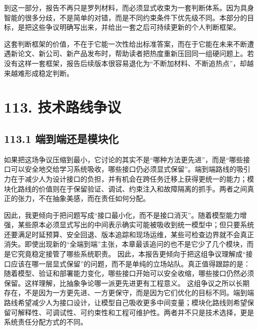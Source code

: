 

到这一部分，报告不再只是罗列材料，而必须显式收束为一套判断体系。因为具身智能的很多分歧，不是简单的对错，而是不同约束条件下优先级不同。本部分的目标，是把这些争议明确写出来，并给出一套之后可持续更新的个人判断框架。

这套判断框架的价值，不在于它能一次性给出标准答案，而在于它能在未来不断遭遇新论文、新公司、新产品发布时，帮助读者把热度重新压回同一组硬问题上。若没有这样一套框架，报告后续版本很容易退化为“不断加材料、不断追热点”，却越来越难形成稳定判断。

\section*{113. 技术路线争议}

\subsection*{113.1 端到端还是模块化}


如果把这场争议压缩到最小，它讨论的其实不是“哪种方法更先进”，而是“哪些接口可以安全地交给学习系统吸收，哪些接口仍必须显式保留”。端到端路线的吸引力在于减少人为设计接口的负担，并有机会在跨任务迁移上获得更统一的能力；模块化路线的价值则在于保留验证、调试、约束注入和故障隔离的抓手。两者之间真正的张力，不在抽象美感，而在责任如何分配。

因此，我更倾向于把问题写成“接口最小化，而不是接口消灭”。随着模型能力增强，某些原本必须显式写出的中间表示确实可能被吸收到统一模型中；但只要系统还要满足时延预算、安全回退、版本追踪和现场运维，某些可检查边界就不会真正消失。即使出现新的“全端到端”主张，本章最该追问的也不是它少了几个模块，而是它究竟稳定接管了哪些系统职责。 因此，本报告更倾向于把这组争议理解成“接口应该在哪一层显式保留”的问题，而不是单纯的立场站队。真正值得跟踪的是：随着模型、验证和部署能力变化，哪些接口开始可以安全收缩，哪些接口仍然必须保留。这样理解，比抽象争论哪一派更先进更有工程意义。 这组争议之所以长期存在，不是因为一方更先进、一方更保守，而是因为它们优化的目标不同。端到端路线希望减少人为接口设计，让模型自己吸收更多中间变量；模块化路线则希望保留可解释性、可调试性、可约束性和工程可维护性。两者并不只是技术选择，更是系统责任分配方式的不同。

